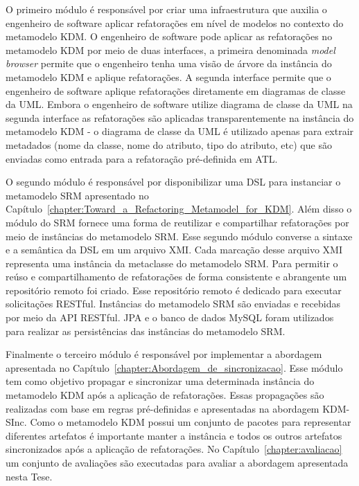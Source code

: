 O primeiro módulo é responsável por criar uma infraestrutura que auxilia o engenheiro de software aplicar refatorações em nível de modelos no contexto do metamodelo KDM. O engenheiro de software pode aplicar as refatorações no metamodelo KDM por meio de duas interfaces, a primeira denominada \textit{model browser} permite que o engenheiro tenha uma visão de árvore da instância do metamodelo KDM e aplique refatorações. A segunda interface permite que o engenheiro de software aplique refatorações diretamente em diagramas de classe da UML. Embora o engenheiro de software utilize diagrama de classe da UML na segunda interface as refatorações são aplicadas transparentemente na instância do metamodelo KDM - o diagrama de classe da UML é utilizado apenas para extrair metadados (nome da classe, nome do atributo, tipo do atributo, etc) que são enviadas como entrada para a refatoração pré-definida em ATL.

O segundo módulo é responsável por disponibilizar uma DSL para instanciar o metamodelo SRM apresentado no Capítulo~\ref{chapter:Toward_a_Refactoring_Metamodel_for_KDM}. Além disso o módulo do SRM fornece uma forma de reutilizar e compartilhar refatorações por meio de instâncias do metamodelo SRM. Esse segundo módulo converse a sintaxe e a semântica da DSL em um arquivo XMI. Cada marcação desse arquivo XMI representa uma instância da metaclasse do metamodelo SRM. Para permitir o reúso e compartilhamento de refatorações de forma consistente e abrangente um repositório remoto foi criado. Esse repositório remoto é dedicado para executar solicitações RESTful. Instâncias do metamodelo SRM são enviadas e recebidas por meio da API RESTful. JPA e o banco de dados MySQL foram utilizados para realizar as persistências das instâncias do metamodelo SRM.

Finalmente o terceiro módulo é responsável por implementar a abordagem apresentada no Capítulo~\ref{chapter:Abordagem_de_sincronizacao}. Esse módulo tem como objetivo propagar e sincronizar uma determinada instância do metamodelo KDM após a aplicação de refatorações. Essas propagações são realizadas com base em regras pré-definidas e apresentadas na abordagem KDM-SInc. Como o metamodelo KDM possui um conjunto de pacotes para representar diferentes artefatos é importante manter a instância e todos os outros artefatos sincronizados após a aplicação de refatorações. No Capítulo~\ref{chapter:avaliacao} um conjunto de avaliações são executadas para avaliar a abordagem apresentada nesta Tese.